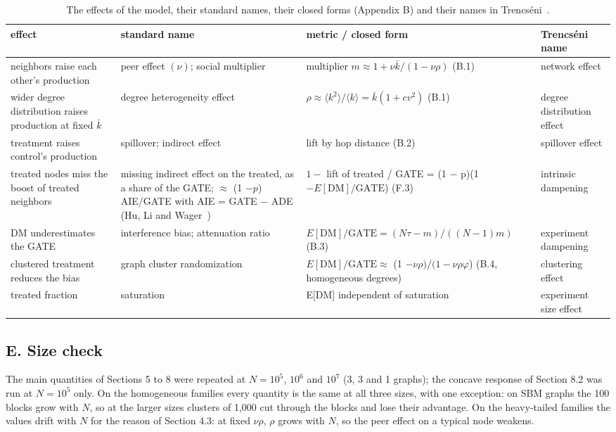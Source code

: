 \documentclass[final,5p,times,twocolumn,number]{elsarticle}
\begin{document}
\begin{table}[!tp]
\caption{The effects of the model, their standard names, their closed forms (Appendix B) and their names in Trencséni~\cite{r20}.}\label{tab:names}
\centering
\footnotesize
\renewcommand{\arraystretch}{1.2}
\begin{tabularx}{\linewidth}{>{\raggedright\arraybackslash}X>{\raggedright\arraybackslash}X>{\raggedright\arraybackslash}X>{\raggedright\arraybackslash}X}
\toprule
\textbf{effect} & \textbf{standard name} & \textbf{metric / closed form} & \textbf{Trencséni~\cite{r20} name} \\
\midrule[\heavyrulewidth]
neighbors raise each other's production & peer effect $(\nu )$; social multiplier & multiplier $m \approx  1 + \nu  \bar k/(1 - \nu  \rho )$ (B.1) & network effect\\
\hline
wider degree distribution raises production at fixed $\bar k$  & degree heterogeneity effect & $\rho  \approx  ⟨k^{2}⟩/⟨k⟩ = \bar k(1 + cv^{2})$ (B.1) & degree distribution effect\\
\hline
treatment raises control's production & spillover; indirect effect & lift by hop distance (B.2) & spillover effect\\
\hline
treated nodes miss the boost of treated neighbors & missing indirect effect on the treated, as a share of the GATE; $\approx $ (1 $- p$) AIE/GATE with AIE = GATE $-$ ADE (Hu, Li and Wager~\cite{r12}) & $1 -$ lift of treated / GATE = (1 $-$ p)(1 $- E[\mathrm{DM}]/\mathrm{GATE}$) (F.3) & intrinsic dampening\\
\hline
DM underestimates the GATE & interference bias; attenuation ratio & $E[\mathrm{DM}]/\mathrm{GATE} = (N τ - m)/((N - 1) m)$ (B.3) & experiment dampening\\
\hline
clustered treatment reduces the bias & graph cluster randomization & $E[\mathrm{DM}]/\mathrm{GATE} \approx $ (1 $- \nu  \rho )/(1 - \nu  \rho  φ$) (B.4, homogeneous degrees) & clustering effect\\
\hline
treated fraction & saturation & E[DM] independent of saturation & experiment size effect \\
\bottomrule
\end{tabularx}
\end{table}


\subsection*{E. Size check}

The main quantities of Sections 5 to 8 were repeated at $N = 10^5$, $10^6$  and $10^7$  (3, 3 and 1 graphs); the concave response of Section 8.2 was run at $N = 10^5$  only. On the homogeneous families every quantity is the same at all three sizes, with one exception: on SBM graphs the 100 blocks grow with $N$, so at the larger sizes clusters of 1,000 cut through the blocks and lose their advantage. On the heavy-tailed families the values drift with $N$  for the reason of Section 4.3: at fixed $\nu\rho$, $\rho$  grows with $N$, so the peer effect on a typical node weakens.
\end{document}
